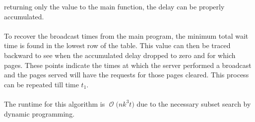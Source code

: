 \documentclass[12pt]{article}
\newcommand{\BigO}[1]{\ensuremath{\operatorname{\mathcal{O}}\bigl(#1\bigr)}}
\begin{document}
returning only the value to the main function, the delay can be properly
accumulated.\\\\
To recover the broadcast times from the main program, the minimum total
wait time is found in the lowest row of the table.  This value can then 
be traced backward to see when the accumulated delay dropped to zero
and for which pages.  These points indicate the times at which the
server performed a broadcast and the pages served will have the requests
for those pages cleared.  This process can be repeated till time $t_1$.\\\\
The runtime for this algorithm is \BigO{nk^{3}t} due to the necessary
subset search by dynamic programming.
\end{document}
